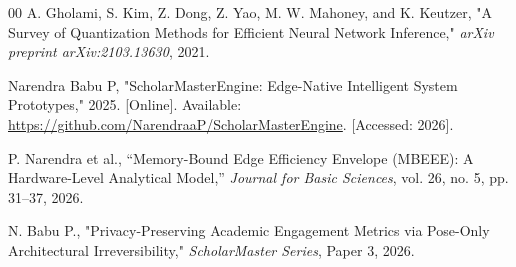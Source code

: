 \documentclass[conference]{IEEEtran}
\begin{document}
\begin{thebibliography}{00}
 A. Gholami, S. Kim, Z. Dong, Z. Yao, M. W. Mahoney, and K. Keutzer, "A Survey of Quantization Methods for Efficient Neural Network Inference," \textit{arXiv preprint arXiv:2103.13630}, 2021.

 Narendra Babu P, "ScholarMasterEngine: Edge-Native Intelligent System Prototypes," 2025. [Online]. Available: \url{https://github.com/NarendraaP/ScholarMasterEngine}. [Accessed: 2026].

 P. Narendra et al., ``Memory-Bound Edge Efficiency Envelope (MBEEE): A Hardware-Level Analytical Model,'' \textit{Journal for Basic Sciences}, vol. 26, no. 5, pp. 31--37, 2026.

 N. Babu P., "Privacy-Preserving Academic Engagement Metrics via Pose-Only Architectural Irreversibility," \textit{ScholarMaster Series}, Paper 3, 2026.

\end{thebibliography}
\end{document}
